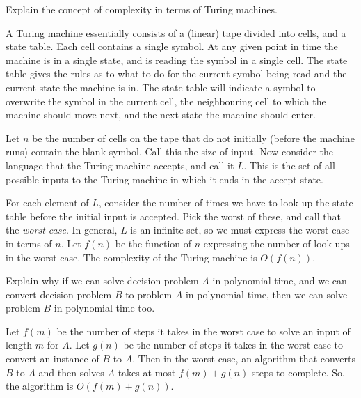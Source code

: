 \documentclass[a4paper, 12pt]{exam}
\begin{document}
\begin{questions}
\begin{solution}
  \end{solution}

\question
  Explain the concept of complexity in terms of Turing machines.
  \begin{solution}
    A Turing machine essentially consists of a (linear) tape divided into cells, and a state table.
    Each cell contains a single symbol.
    At any given point in time the machine is in a single state, and is reading the symbol in a single cell.
    The state table gives the rules as to what to do for the current symbol being read and the current state the machine is in.
    The state table will indicate a symbol to overwrite the symbol in the current cell, the neighbouring cell to which the machine should move next, and the next state the machine should enter.

    Let $n$ be the number of cells on the tape that do not initially (before the machine runs) contain the blank symbol.
    Call this the size of input.
    Now consider the language that the Turing machine accepts, and call it $L$.
    This is the set of all possible inputs to the Turing machine in which it ends in the accept state.
    
    For each element of $L$, consider the number of times we have to look up the state table before the initial input is accepted.
    Pick the worst of these, and call that the \emph{worst case}.
    In general, $L$ is an infinite set, so we must express the worst case in terms of $n$.
    Let $f(n)$ be the function of $n$ expressing the number of look-ups in the worst case.
    The complexity of the Turing machine is $O(f(n))$.
  \end{solution}

\question
  Explain why if we can solve decision problem $A$ in polynomial time, and we can convert decision problem $B$ to problem $A$ in polynomial time, then we can solve problem $B$ in polynomial time too.
  \begin{solution}
    Let $f(m)$ be the number of steps it takes in the worst case to solve an input of length $m$ for $A$.
    Let $g(n)$ be the number of steps it takes in the worst case to convert an instance of $B$ to $A$.
    Then in the worst case, an algorithm that converts $B$ to $A$ and then solves $A$ takes at most $f(m)+g(n)$ steps to complete.
    So, the algorithm is $O(f(m)+g(n))$.


\end{solution}
\end{questions}
\end{document}
